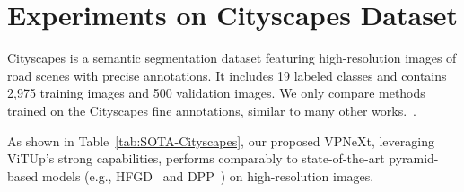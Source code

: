 


\section{Experiments on Cityscapes Dataset}

Cityscapes is a semantic segmentation dataset featuring high-resolution images of road scenes with precise annotations. 
%
It includes 19 labeled classes and contains 2,975 training images and 500 validation images.
%
We only compare methods trained on the Cityscapes fine annotations, similar to many other works.~\cite{cSegFormer,cKMaXDeepLab}.

As shown in Table~\ref{tab:SOTA-Cityscapes}, our proposed VPNeXt, leveraging ViTUp's strong capabilities, performs comparably to state-of-the-art pyramid-based models (e.g., HFGD~\cite{cHFGD} and DPP~\cite{cDDP}) on high-resolution images.
%


